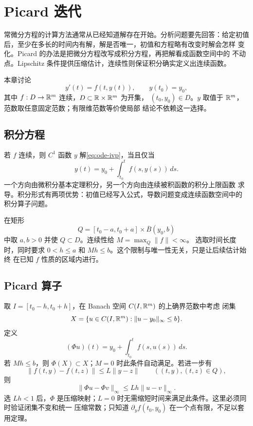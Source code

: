 \chapter{Picard 迭代}
\label{chap:picard-iteration}

常微分方程的计算方法通常从已经知道解存在开始。分析问题要先回答：给定初值
后，至少在多长的时间内有解，解是否唯一，初值和方程略有改变时解会怎样
变化。Picard 的办法是把微分方程改写成积分方程，再把解看成函数空间中的
不动点。Lipschitz 条件提供压缩估计，连续性则保证积分确实定义出连续函数。

本章讨论
\begin{equation}\label{eq:ode-ivp}
 y'(t)=f(t,y(t)),\qquad y(t_0)=y_0,
\end{equation}
其中 \(f:D\to\mathbb{R}^m\) 连续，\(D\subset\mathbb{R}\times\mathbb{R}^m\) 为开集，
\((t_0,y_0)\in D\)。\(y\) 取值于 \(\mathbb{R}^m\)，范数取任意固定范数；有限维范数等价使局部
结论不依赖这一选择。

\section{积分方程}

若 \(f\) 连续，则 \(C^1\) 函数 \(y\) 解\eqref{eq:ode-ivp}，当且仅当
\begin{equation}\label{eq:ode-integral-equation}
 y(t)=y_0+\int_{t_0}^{t}f(s,y(s))\,ds.
\end{equation}
一个方向由微积分基本定理积分，另一个方向由连续被积函数的积分上限函数
求导。积分形式有两项优势：初值已经写入公式，导数问题变成连续函数空间中的
积分算子问题。

在矩形
\[
 Q=[t_0-a,t_0+a]\times\overline B(y_0,b)
\]
中取 \(a,b>0\) 并使 \(Q\subset D\)。连续性给 \(M=\max_Q\|f\|<\infty\)。
选取时间长度时，同时要求 \(0<h\le a\) 和 \(Mh\le b\)。这个限制与唯一性无关，只是让后续估计始终
在已知 \(f\) 性质的区域内进行。

\section{Picard 算子}

取 \(I=[t_0-h,t_0+h]\)，在 Banach 空间 \(C(I,\mathbb{R}^m)\) 的上确界范数中考虑
闭集
\[
 X=\{u\in C(I,\mathbb{R}^m):\|u-y_0\|_\infty\le b\}.
\]
定义
\[
 (\Phi u)(t)=y_0+\int_{t_0}^{t}f(s,u(s))\,ds.
\]
若 \(Mh\le b\)，则 \(\Phi(X)\subset X\)；\(M=0\) 时此条件自动满足。若进一步有
\begin{equation}\label{eq:ode-lipschitz-y}
 \|f(t,y)-f(t,z)\|\le L\|y-z\|\qquad((t,y),(t,z)\in Q),
\end{equation}
则
\[
 \|\Phi u-\Phi v\|_\infty\le Lh\|u-v\|_\infty.
\]
选 \(Lh<1\) 后，\(\Phi\) 是压缩映射；\(L=0\) 时无需缩短时间来满足此条件。这里必须同时验证闭集不变和统一
压缩常数；只知道 \(\partial_yf(t_0,y_0)\) 在一个点有限，不足以套用定理。

